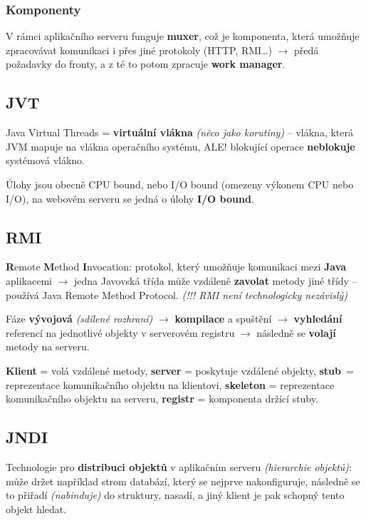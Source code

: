\subsubsection*{Komponenty}

V rámci aplikačního serveru funguje \textbf{muxer}, což je komponenta, která umožňuje zpracovávat komunikaci i přes jiné protokoly (HTTP, RMI\ldots) $\to$ předá požadavky do fronty, a z té to potom zpracuje \textbf{work manager}.


\subsection{JVT}

Java Virtual Threads = \textbf{virtuální vlákna} \textit{(něco jako korutiny)} -- vlákna, která JVM mapuje na vlákna operačního systému, ALE! blokující operace \textbf{neblokuje} systémová vlákno.

Úlohy jsou obecně CPU bound, nebo I/O bound (omezeny výkonem CPU nebo I/O), na webovém serveru se jedná o úlohy \textbf{I/O bound}.

\subsection{RMI}

\textbf{R}emote \textbf{M}ethod \textbf{I}nvocation: protokol, který umožňuje komunikaci mezi \textbf{Java} aplikacemi $\to$ jedna Javovská třída může vzdáleně \textbf{zavolat} metody jiné třídy -- používá Java Remote Method Protocol. \textit{(!!! RMI není technologicky nezávislý)}

Fáze \textbf{vývojová} \textit{(sdílené rozhraní)} $\to$ \textbf{kompilace} a spuštění $\to$ \textbf{vyhledání} referencí na jednotlivé objekty v serverovém registru $\to$ následně se \textbf{volají} metody na serveru.

\textbf{Klient} = volá vzdálené metody, \textbf{server} = poskytuje vzdálené objekty, \textbf{stub}~= reprezentace komunikačního objektu na klientovi, \textbf{skeleton} = reprezentace komunikačního objektu na serveru, \textbf{registr} = komponenta držící stuby.

\subsection{JNDI}

Technologie pro \textbf{distribuci objektů} v aplikačním serveru \textit{(hierarchie objektů)}: může držet například\textbf{ }strom databází, který se nejprve nakonfiguruje, následně se to přiřadí \textit{(nabinduje)} do struktury, nasadí, a jiný klient je pak schopný tento objekt hledat.

